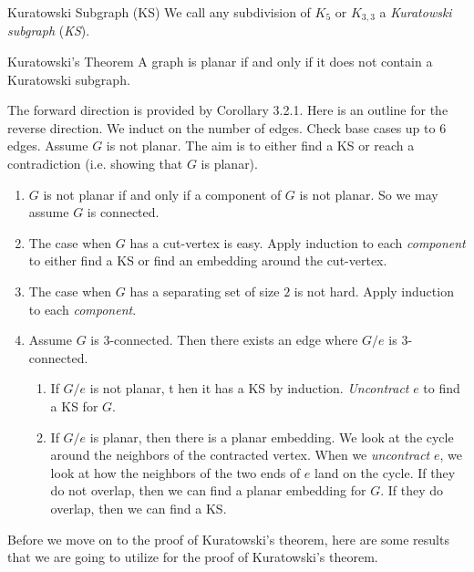 \documentclass[co342]{subfiles}
\begin{document}
    \begin{definition}{Kuratowski Subgraph (KS)}{}
        We call any subdivision of $K_5$ or $K_{3,3}$ a \emph{Kuratowski subgraph} (\emph{KS}).
    \end{definition}

    \begin{theorem}{Kuratowski's Theorem}
        A graph is planar if and only if it does not contain a Kuratowski subgraph.
    \end{theorem}

    The forward direction is provided by Corollary 3.2.1. Here is an outline for the reverse direction. We induct on the number of edges. Check base cases up to $6$ edges. Assume $G$ is not planar. The aim is to either find a KS or reach a contradiction (i.e. showing that $G$ is planar).
    \begin{enumerate}
        \item $G$ is not planar if and only if a component of $G$ is not planar. So we may assume $G$ is connected.
        \item The case when $G$ has a cut-vertex is easy. Apply induction to each \textit{component} to either find a KS or find an embedding around the cut-vertex.
        \item The case when $G$ has a separating set of size $2$ is not hard. Apply induction to each \textit{component}.
        \item Assume $G$ is $3$-connected. Then there exists an edge where $G /e$ is $3$-connected.
            \begin{enumerate}
                \item If $G /e$ is not planar, t hen it has a KS by induction. \textit{Uncontract} $e$ to find a KS for $G$.
                \item If $G /e$ is planar, then there is a planar embedding. We look at the cycle around the neighbors of the contracted vertex. When we \textit{uncontract} $e$, we look at how the neighbors of the two ends of $e$ land on the cycle. If they do not overlap, then we can find a planar embedding for $G$. If they do overlap, then we can find a KS.
            \end{enumerate}
    \end{enumerate}
    \noindent Before we move on to the proof of Kuratowski's theorem, here are some results that we are going to utilize for the proof of Kuratowski's theorem.
    
\end{document}
